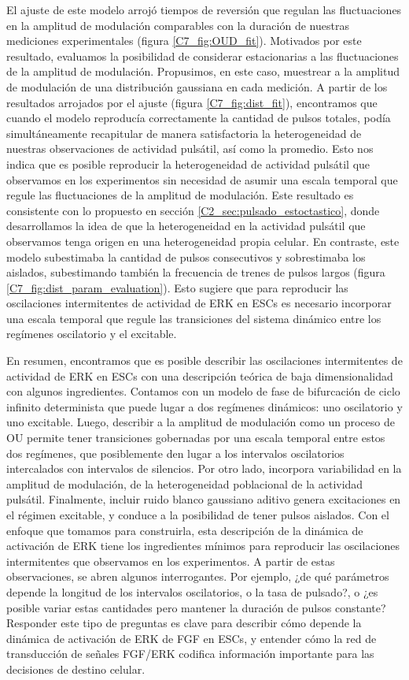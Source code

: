 \documentclass[./main.tex]{subfiles}
\begin{document}
El ajuste de este modelo arrojó tiempos de reversión que regulan las fluctuaciones en la amplitud de modulación comparables con la duración de nuestras mediciones experimentales (figura \ref{C7_fig:OUD_fit}). Motivados por este resultado, evaluamos la posibilidad de considerar estacionarias a las fluctuaciones de la amplitud de modulación. Propusimos, en este caso, muestrear a la amplitud de modulación de una distribución gaussiana en cada medición. A partir de los resultados arrojados por el ajuste (figura \ref{C7_fig:dist_fit}), encontramos que cuando el modelo reproducía correctamente la cantidad de pulsos totales, podía simultáneamente recapitular de manera satisfactoria la heterogeneidad de nuestras observaciones de actividad pulsátil, así como la promedio. Esto nos indica que es posible reproducir la heterogeneidad de actividad pulsátil que observamos en los experimentos sin necesidad de asumir una escala temporal que regule las fluctuaciones de la amplitud de modulación. Este resultado es consistente con lo propuesto en sección \ref{C2_sec:pulsado_estoctastico}, donde desarrollamos la idea de que la heterogeneidad en la actividad pulsátil que observamos tenga origen en una heterogeneidad propia celular. En contraste, este modelo subestimaba la cantidad de pulsos consecutivos y sobrestimaba los aislados, subestimando también la frecuencia de trenes de pulsos largos (figura \ref{C7_fig:dist_param_evaluation}). Esto sugiere que para reproducir las oscilaciones intermitentes de actividad de ERK en ESCs es necesario incorporar una escala temporal que regule las transiciones del sistema dinámico entre los regímenes oscilatorio y el excitable. 


En resumen, encontramos que es posible describir las oscilaciones intermitentes de actividad de ERK en ESCs con una descripción teórica de baja dimensionalidad con algunos ingredientes. Contamos con un modelo de fase de bifurcación de ciclo infinito determinista que puede lugar a dos regímenes dinámicos: uno oscilatorio y uno excitable. Luego, describir a la amplitud de modulación como un proceso de OU permite tener transiciones gobernadas por una escala temporal entre estos dos regímenes, que posiblemente den lugar a los intervalos oscilatorios intercalados con intervalos de silencios. Por otro lado, incorpora variabilidad en la amplitud de modulación, de la heterogeneidad poblacional de la actividad pulsátil. Finalmente, incluir ruido blanco gaussiano aditivo genera excitaciones en el régimen excitable, y conduce a la posibilidad de tener pulsos aislados. Con el enfoque que tomamos para construirla, esta descripción de la dinámica de activación de ERK tiene los ingredientes mínimos para reproducir las oscilaciones intermitentes que observamos en los experimentos. A partir de estas observaciones, se abren algunos interrogantes. Por ejemplo, ¿de qué parámetros depende la longitud de los intervalos oscilatorios, o la tasa de pulsado?, o ¿es posible variar estas cantidades pero mantener la duración de pulsos constante? Responder este tipo de preguntas es clave para describir cómo depende la dinámica de activación de ERK de FGF en ESCs, y entender cómo la red de transducción de señales FGF/ERK codifica información importante para las decisiones de destino celular. 
\end{document}
